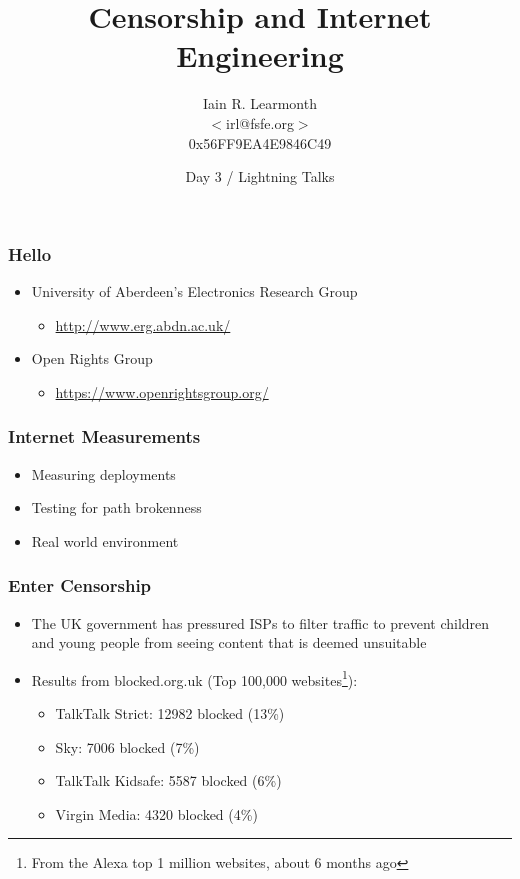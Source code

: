 \documentclass{beamer}
\title{Censorship and Internet Engineering}
\author[Iain R. Learmonth]{Iain R. Learmonth \\ $<$irl@fsfe.org$>$ \\ 0x56FF9EA4E9846C49}
\institute[UoA / ORG]{University of Aberdeen / Open Rights Group}
\date[Day 3]{Day 3 / Lightning Talks}
\begin{document}
\begin{frame}
\maketitle
\end{frame}

\begin{frame}
	\frametitle{Hello}
	\begin{itemize}
		\item{University of Aberdeen's Electronics Research Group}
			\begin{itemize}
				\item{\url{http://www.erg.abdn.ac.uk/}}
			\end{itemize}
		\item{Open Rights Group}
			\begin{itemize}
				\item{\url{https://www.openrightsgroup.org/}}
			\end{itemize}
	\end{itemize}
\end{frame}

\begin{frame}
	\frametitle{Internet Measurements}
	\begin{itemize}
		\item{Measuring deployments}
		\item{Testing for path brokenness}
		\item{Real world environment}
	\end{itemize}
\end{frame}

\begin{frame}
	\frametitle{Enter Censorship}
	\begin{itemize}
		\item{The UK government has pressured ISPs to filter traffic to prevent children and young people from seeing content that is deemed unsuitable}
		\item{Results from blocked.org.uk (Top 100,000 websites\footnote{From the Alexa top 1 million websites, about 6 months ago}):}
		\begin{itemize}
			\item{TalkTalk Strict: 12982 blocked (13\%)}
			\item{Sky: 7006 blocked (7\%)}
			\item{TalkTalk Kidsafe: 5587 blocked (6\%)}
			\item{Virgin Media: 4320 blocked (4\%)}
		\end{itemize}
	\end{itemize}
\end{frame}
\end{document}
